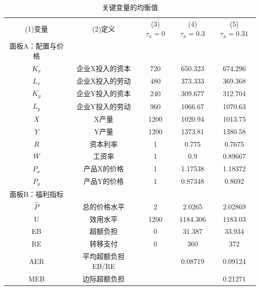 \documentclass[cn,12pt,math=newtx,citestyle=gb7714-2015,bibstyle=gb7714-2015]{elegantbook}
\begin{document}
	\begin{table}[!htbp]
		\centering
		\caption{关键变量的均衡值}
		\begin{tabular}{ccccc}
			\hline
			(1)变量& (2)定义 &(3)$\tau_x=0$  & (4)$\tau_x=0.3$ & (5)$\tau_x=0.31$ \\
			
			面板A：配置与价格  \\
			
			$K_x$	& 企业X投入的资本 & 720 & 650.323 & 674.296 \\
			
			$L_x$	& 企业X投入的劳动 & 480 &373.333  & 369.368 \\
			
			$K_y$	&企业Y投入的资本  & 240 & 309.677 & 312.704 \\
			
			$L_y$	&企业Y投入的劳动  & 960 &1066.67  &1070.63  \\
			
			$X$	&X产量  & 1200 & 1020.94 & 1013.75 \\
			
			$Y$	&Y产量  &1200  &1373.81  &1380.58  \\
			
			$R$	& 资本利率 & 1 & 0.775 & 0.7675 \\
			
			$W$ &工资率  & 1 & 0.9 & 0.89667 \\
			
			$P_x$	&产品X的价格  & 1 & 1.17538 & 1.18372 \\
			
			$P_y$	& 产品Y的价格 & 1 & 0.87348 & 0.8692 \\
			
			面板B：福利指标  \\
			
			$\hat{P}$	& 总的价格水平 & 2 &2.0265  & 2.02869 \\
			
			U	& 效用水平 & 1200 & 1184.306 & 1183.03 \\
			
			EB	& 超额负担 & 0 & 31.387 & 33.934 \\
			
			RE	& 转移支付 & 0 & 360 & 372 \\
			
			AER	&平均超额负担EB/RE  &  & 0.08719 & 0.09124 \\
			
			MEB	&边际超额负担  &  &  & 0.21271 \\
			\hline
		\end{tabular}
	\end{table}
	
\end{document}
